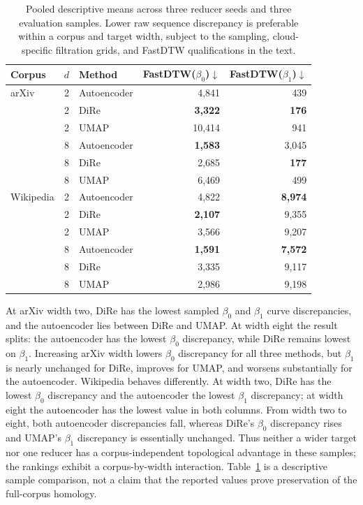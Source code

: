 \documentclass[10pt]{article}
\begin{document}
\begin{table}[ht]
\centering
\small
\begin{tabular}{lrlrr}
\toprule
Corpus & $d$ & Method & FastDTW($\beta_0$)$\downarrow$ & FastDTW($\beta_1$)$\downarrow$\\
\midrule
arXiv & 2 & Autoencoder & 4,841 & 439\\
      & 2 & DiRe & \textbf{3,322} & \textbf{176}\\
      & 2 & UMAP & 10,414 & 941\\
      & 8 & Autoencoder & \textbf{1,583} & 3,045\\
      & 8 & DiRe & 2,685 & \textbf{177}\\
      & 8 & UMAP & 6,469 & 499\\
\midrule
Wikipedia & 2 & Autoencoder & 4,822 & \textbf{8,974}\\
          & 2 & DiRe & \textbf{2,107} & 9,355\\
          & 2 & UMAP & 3,566 & 9,207\\
          & 8 & Autoencoder & \textbf{1,591} & \textbf{7,572}\\
          & 8 & DiRe & 3,335 & 9,117\\
          & 8 & UMAP & 2,986 & 9,198\\
\bottomrule
\end{tabular}
\caption{Pooled descriptive means across three reducer seeds and three evaluation samples.
Lower raw sequence discrepancy is preferable within a corpus and target width, subject
to the sampling, cloud-specific filtration grids, and FastDTW qualifications in the
text.}
\label{tab:topology}
\end{table}

At arXiv width two, DiRe has the lowest sampled $\beta_0$ and $\beta_1$ curve
discrepancies, and the autoencoder lies between DiRe and UMAP.  At width eight the result
splits: the autoencoder has the lowest $\beta_0$ discrepancy, while DiRe remains lowest
on $\beta_1$.  Increasing arXiv width lowers $\beta_0$ discrepancy for all three methods,
but $\beta_1$ is nearly unchanged for DiRe, improves for UMAP, and worsens substantially
for the autoencoder.  Wikipedia behaves differently.  At width two, DiRe has the lowest
$\beta_0$ discrepancy and the autoencoder the lowest $\beta_1$ discrepancy; at width
eight the autoencoder has the lowest value in both columns.  From width two to eight,
both autoencoder discrepancies fall, whereas DiRe's $\beta_0$ discrepancy rises and
UMAP's $\beta_1$ discrepancy is essentially unchanged.  Thus neither a wider target nor
one reducer has a corpus-independent topological advantage in these samples; the
rankings exhibit a corpus-by-width interaction.  Table~\ref{tab:topology} is a
descriptive sample comparison, not a claim that the reported values prove preservation
of the full-corpus homology.
\end{document}
